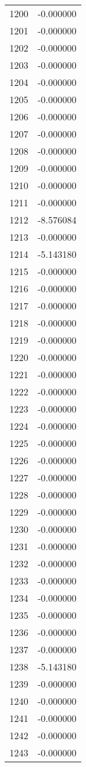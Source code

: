\documentclass[12pt]{article}
\begin{document}
\begin{longtable}{@{}cc@{}}
1200 & -0.000000 \\
1201 & -0.000000 \\
1202 & -0.000000 \\
1203 & -0.000000 \\
1204 & -0.000000 \\
1205 & -0.000000 \\
1206 & -0.000000 \\
1207 & -0.000000 \\
1208 & -0.000000 \\
1209 & -0.000000 \\
1210 & -0.000000 \\
1211 & -0.000000 \\
1212 & -8.576084 \\
1213 & -0.000000 \\
1214 & -5.143180 \\
1215 & -0.000000 \\
1216 & -0.000000 \\
1217 & -0.000000 \\
1218 & -0.000000 \\
1219 & -0.000000 \\
1220 & -0.000000 \\
1221 & -0.000000 \\
1222 & -0.000000 \\
1223 & -0.000000 \\
1224 & -0.000000 \\
1225 & -0.000000 \\
1226 & -0.000000 \\
1227 & -0.000000 \\
1228 & -0.000000 \\
1229 & -0.000000 \\
1230 & -0.000000 \\
1231 & -0.000000 \\
1232 & -0.000000 \\
1233 & -0.000000 \\
1234 & -0.000000 \\
1235 & -0.000000 \\
1236 & -0.000000 \\
1237 & -0.000000 \\
1238 & -5.143180 \\
1239 & -0.000000 \\
1240 & -0.000000 \\
1241 & -0.000000 \\
1242 & -0.000000 \\
1243 & -0.000000 \\

\end{longtable}
\end{document}
